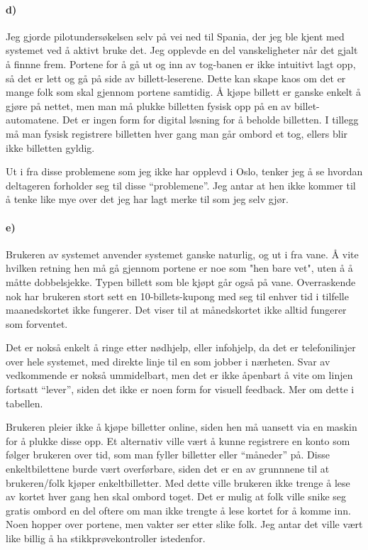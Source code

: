 \documentclass{../../myassignment}
\begin{document}
	\paragraph*{d)}
	Jeg gjorde pilotunders{\o}kelsen selv p{\aa} vei ned til Spania, der jeg ble kjent med systemet ved {\aa} aktivt bruke det. Jeg opplevde en del vanskeligheter n{\aa}r det gjalt {\aa} finnne frem. Portene for {\aa} g{\aa} ut og inn av tog-banen er ikke intuitivt lagt opp, s{\aa} det er lett og g{\aa} p{\aa} side av billett-leserene. Dette kan skape kaos om det er mange folk som skal gjennom portene samtidig. {\AA} kj{\o}pe billett er ganske enkelt {\aa} gj{\o}re p{\aa} nettet, men man m{\aa} plukke billetten fysisk opp p{\aa} en av billet-automatene. Det er ingen form for digital l{\o}sning for {\aa} beholde billetten. I tillegg m{\aa} man fysisk registrere billetten hver gang man g{\aa}r ombord et tog, ellers blir ikke billetten gyldig.

	Ut i fra disse problemene som jeg ikke har opplevd i Oslo, tenker jeg {\aa} se hvordan deltageren forholder seg til disse ``problemene''. Jeg antar at hen ikke kommer til {\aa} tenke like mye over det jeg har lagt merke til som jeg selv gj{\o}r. 

	\paragraph*{e)}
	Brukeren av systemet anvender systemet ganske naturlig, og ut i fra vane. {\AA} vite hvilken retning hen m{\aa} g{\aa} gjennom portene er noe som "hen bare vet", uten {\aa} {\aa} m{\aa}tte dobbelsjekke. Typen billett som ble kj{\o}pt g{\aa}r ogs{\aa} p{\aa} vane. Overraskende nok har brukeren stort sett en 10-billets-kupong med seg til enhver tid i tilfelle maanedskortet ikke fungerer. Det viser til at m{\aa}nedskortet ikke alltid fungerer som forventet. 

	Det er noks{\aa} enkelt {\aa} ringe etter n{\o}dhjelp, eller infohjelp, da det er telefonilinjer over hele systemet, med direkte linje til en som jobber i n{\ae}rheten. Svar av vedkommende er noks{\aa} ummidelbart, men det er ikke {\aa}penbart {\aa} vite om linjen fortsatt ``lever'', siden det ikke er noen form for visuell feedback. Mer om dette i tabellen. 

	Brukeren pleier ikke {\aa} kj{\o}pe billetter online, siden hen m{\aa} uansett via en maskin for {\aa} plukke disse opp. Et alternativ ville v{\ae}rt {\aa} kunne registrere en konto som f{\o}lger brukeren over tid, som man fyller billetter eller ``m{\aa}neder'' p{\aa}. Disse enkeltbilettene burde v{\ae}rt overf{\o}rbare, siden det er en av grunnnene til at brukeren/folk kj{\o}per enkeltbilletter. Med dette ville brukeren ikke trenge {\aa} lese av kortet hver gang hen skal ombord toget. Det er mulig at folk ville snike seg gratis ombord en del oftere om man ikke trengte {\aa} lese kortet for {\aa} komme inn. Noen hopper over portene, men vakter ser etter slike folk. Jeg antar det ville v{\ae}rt like billig {\aa} ha stikkpr{\o}vekontroller istedenfor. 
\end{document}
